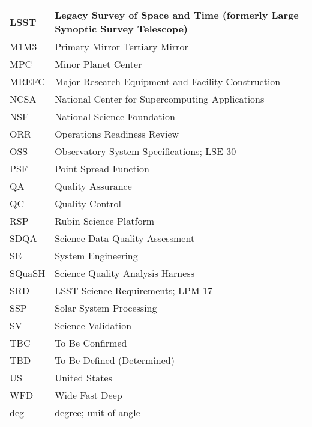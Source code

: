 \begin{longtable}{p{}p{}}
LSST & Legacy Survey of Space and Time (formerly Large Synoptic Survey Telescope) \\\hline
M1M3 & Primary Mirror Tertiary Mirror \\\hline
MPC & Minor Planet Center \\\hline
MREFC & Major Research Equipment and Facility Construction \\\hline
NCSA & National Center for Supercomputing Applications \\\hline
NSF & National Science Foundation \\\hline
ORR & Operations Readiness Review \\\hline
OSS & Observatory System Specifications; LSE-30 \\\hline
PSF & Point Spread Function \\\hline
QA & Quality Assurance \\\hline
QC & Quality Control \\\hline
RSP & Rubin Science Platform \\\hline
SDQA & Science Data Quality Assessment \\\hline
SE & System Engineering \\\hline
SQuaSH & Science Quality Analysis Harness \\\hline
SRD & LSST Science Requirements; LPM-17 \\\hline
SSP & Solar System Processing \\\hline
SV & Science Validation \\\hline
TBC & To Be Confirmed \\\hline
TBD & To Be Defined (Determined) \\\hline
US & United States \\\hline
WFD & Wide Fast Deep \\\hline
deg & degree; unit of angle \\\hline
\end{longtable}
